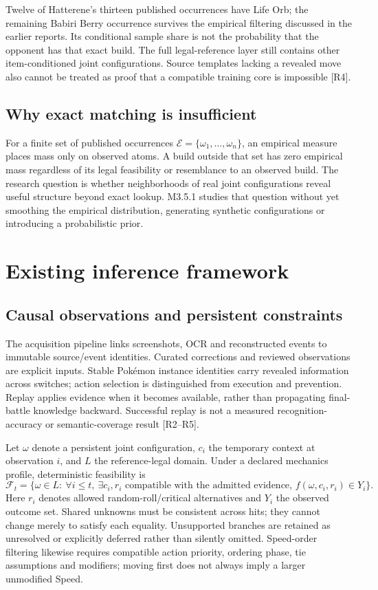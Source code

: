 \documentclass[10pt,a4paper]{article}
\newcommand{\E}{\mathcal{E}}
\newcommand{\F}{\mathcal{F}}
\begin{document}
Twelve of Hatterene's thirteen published occurrences have Life Orb; the remaining Babiri Berry occurrence survives the empirical filtering discussed in the earlier reports. Its conditional sample share is not the probability that the opponent has that exact build. The full legal-reference layer still contains other item-conditioned joint configurations. Source templates lacking a revealed move also cannot be treated as proof that a compatible training core is impossible [R4].

\subsection{Why exact matching is insufficient}
For a finite set of published occurrences $\E=\{\omega_1,\ldots,\omega_n\}$, an empirical measure places mass only on observed atoms. A build outside that set has zero empirical mass regardless of its legal feasibility or resemblance to an observed build. The research question is whether neighborhoods of real joint configurations reveal useful structure beyond exact lookup. M3.5.1 studies that question without yet smoothing the empirical distribution, generating synthetic configurations or introducing a probabilistic prior.
\clearpage

\section{Existing inference framework}
\subsection{Causal observations and persistent constraints}
The acquisition pipeline links screenshots, OCR and reconstructed events to immutable source/event identities. Curated corrections and reviewed observations are explicit inputs. Stable Pok\'emon instance identities carry revealed information across switches; action selection is distinguished from execution and prevention. Replay applies evidence when it becomes available, rather than propagating final-battle knowledge backward. Successful replay is not a measured recognition-accuracy or semantic-coverage result [R2--R5].

Let $\omega$ denote a persistent joint configuration, $c_i$ the temporary context at observation $i$, and $L$ the reference-legal domain. Under a declared mechanics profile, deterministic feasibility is
\begin{equation}
 \F_t=\{\omega\in L:\ \forall i\leq t,\ \exists c_i,r_i\text{ compatible with the admitted evidence, }f(\omega,c_i,r_i)\in Y_i\}.
 \label{eq:feasible}
\end{equation}
Here $r_i$ denotes allowed random-roll/critical alternatives and $Y_i$ the observed outcome set. Shared unknowns must be consistent across hits; they cannot change merely to satisfy each equality. Unsupported branches are retained as unresolved or explicitly deferred rather than silently omitted. Speed-order filtering likewise requires compatible action priority, ordering phase, tie assumptions and modifiers; moving first does not always imply a larger unmodified Speed.
\end{document}
